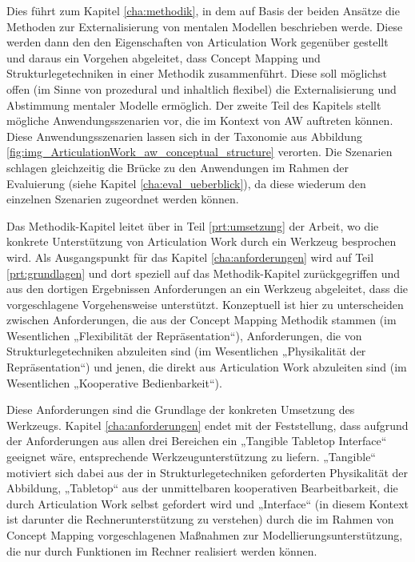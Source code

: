 Dies führt zum Kapitel \ref{cha:methodik}, in dem auf Basis der beiden Ansätze die Methoden zur Externalisierung von mentalen Modellen beschrieben werde. Diese werden dann den den Eigenschaften von Articulation Work gegenüber gestellt und daraus ein Vorgehen abgeleitet, dass Concept Mapping und Strukturlegetechniken in einer Methodik zusammenführt. Diese soll möglichst offen (im Sinne von prozedural und inhaltlich flexibel) die Externalisierung und Abstimmung mentaler Modelle ermöglich. Der zweite Teil des Kapitels stellt mögliche Anwendungsszenarien vor, die im Kontext von AW auftreten können. Diese Anwendungsszenarien lassen sich in der Taxonomie aus Abbildung \ref{fig:img_ArticulationWork_aw_conceptual_structure} verorten. Die Szenarien schlagen gleichzeitig die Brücke zu den Anwendungen im Rahmen der Evaluierung (siehe Kapitel \ref{cha:eval_ueberblick}), da diese wiederum den einzelnen Szenarien zugeordnet werden können.

Das Methodik-Kapitel leitet über in Teil \ref{prt:umsetzung} der Arbeit, wo die konkrete Unterstützung von Articulation Work durch ein Werkzeug besprochen wird. Als Ausgangspunkt für das Kapitel \ref{cha:anforderungen} wird auf Teil \ref{prt:grundlagen} und dort speziell auf das Methodik-Kapitel zurückgegriffen und  aus den dortigen Ergebnissen Anforderungen an ein Werkzeug abgeleitet, dass die vorgeschlagene Vorgehensweise unterstützt. Konzeptuell ist hier zu unterscheiden zwischen Anforderungen, die aus der Concept Mapping Methodik stammen (im Wesentlichen „Flexibilität der Repräsentation“), Anforderungen, die von Strukturlegetechniken abzuleiten sind (im Wesentlichen „Physikalität der Repräsentation“) und jenen, die direkt aus Articulation Work abzuleiten sind (im Wesentlichen „Kooperative Bedienbarkeit“).

Diese Anforderungen sind die Grundlage der konkreten Umsetzung des Werkzeugs. Kapitel \ref{cha:anforderungen} endet mit der Feststellung, dass aufgrund der Anforderungen aus allen drei Bereichen ein „Tangible Tabletop Interface“ geeignet wäre, entsprechende Werkzeugunterstützung zu liefern. „Tangible“ motiviert sich dabei aus der in Strukturlegetechniken geforderten Physikalität der Abbildung, „Tabletop“ aus der unmittelbaren kooperativen Bearbeitbarkeit, die durch Articulation Work selbst gefordert wird und „Interface“ (in diesem Kontext ist darunter die Rechnerunterstützung zu verstehen) durch die im Rahmen von Concept Mapping vorgeschlagenen Maßnahmen zur Modellierungsunterstützung, die nur durch Funktionen im Rechner realisiert werden können.


